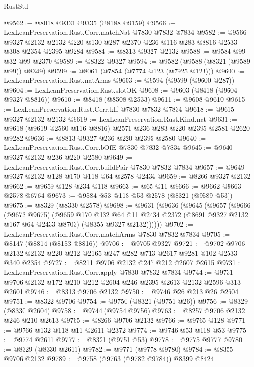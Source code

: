 \begin{lexlean}{RustStd}
\begin{coremodule}
@9562 := @8018 @9331 @9335 (@8188 @9159)
@9566 := LexLeanPreservation.Rust.Corr.matchNat @7830 @7832 @7834
@9582 := @9566
    @9327
    @2132
    @2132
    @220
    @130
    @287
    @2370
    @236
    @116
    @283
    @8816
    @2533
    @308
    @2354
    @2395
    @9284
@9584 := @8313 @9327 @2132
@9588 := @9584 @99 @32 @99 @2370
@9589 := @8322 @9327
@9594 := @9582 (@9588 (@8321 (@9589 @99)) @8349)
@9599 := @8061 (@7854 (@7774 @123 (@7925 @123)))
@9600 := LexLeanPreservation.Rust.natArms
@9603 := @9594 (@9599 (@9600 @287))
@9604 := LexLeanPreservation.Rust.slotOK
@9608 := @9603 (@8418 (@9604 @9327 @8816))
@9610 := @8418 (@8508 @2533)
@9611 := @9608 @9610
@9615 := LexLeanPreservation.Rust.Corr.kIf @7830 @7832 @7834
@9618 := @9615 @9327 @2132 @2132
@9619 := LexLeanPreservation.Rust.Kind.nat
@9631 := @9618 (@9619 @2560 @116 @8816) @2571 @236 @283 @220 @2395 @2581 @2620 @9282
@9636 := @8813 @9327 @236 @220 @2395 @2580
@9640 := LexLeanPreservation.Rust.Corr.bOfE @7830 @7832 @7834
@9645 := @9640 @9327 @2132 @236 @220 @2580
@9649 := LexLeanPreservation.Rust.Corr.buildPair @7830 @7832 @7834
@9657 := @9649 @9327 @2132 @128 @170 @118 @64 @2578 @2434
@9659 := @8266 @9327 @2132
@9662 := @9659 @128 @234 @118
@9663 := @65 @11
@9666 := @9662 @9663 @2578 @6764
@9673 := @9584 @53 @118 @53 @2578 (@8321 (@9589 @53))
@9675 := @8329 (@8330 @2578)
@9698 := @9631
    (@9636
      (@9645
        (@9657
          (@9666
            (@9673 @9675)
            (@9659
              @170
              @132
              @64
              @11
              @2434
              @2372
              (@8691 @9327 @2132 @167 @64 @2433 @8703)
              (@8355 @9327 @2132))))))
@9702 := LexLeanPreservation.Rust.Corr.matchArms @7830 @7832 @7834
@9705 := @8147 (@8814 (@8153 @8816))
@9706 := @9705 @9327
@9721 := @9702 @9706 @2132 @2132 @220 @212 @2165 @247 @282 @713 @2617 @9281 @102 @2533 @340 @2354
@9727 := @8211 @9706 @2132 @247 @212 @2607 @2615
@9731 := LexLeanPreservation.Rust.Corr.apply @7830 @7832 @7834
@9744 := @9731 @9706 @2132 @172 @210 @212 @2604 @246 @2395 @2613 @2132 @2596 @313 @2601
@9746 := @8313 @9706 @2132
@9750 := @9746 @26 @213 @26 @2604
@9751 := @8322 @9706
@9754 := @9750 (@8321 (@9751 @26))
@9756 := @8329 (@8330 @2604)
@9758 := @9744 (@9754 @9756)
@9763 := @8257 @9706 @2132 @246 @210 @2613
@9765 := @8266 @9706 @2132
@9766 := @9765 @128
@9771 := @9766 @132 @118 @11 @2611 @2372
@9774 := @9746 @53 @118 @53
@9775 := @9774 @2611
@9777 := @8321 (@9751 @53)
@9778 := @9775 @9777
@9780 := @8329 (@8330 @2611)
@9782 := @9771 (@9778 @9780)
@9784 := @8355 @9706 @2132
@9789 := @9758 (@9763 (@9782 @9784)) @8399 @8424

\end{coremodule}
\end{lexlean}
